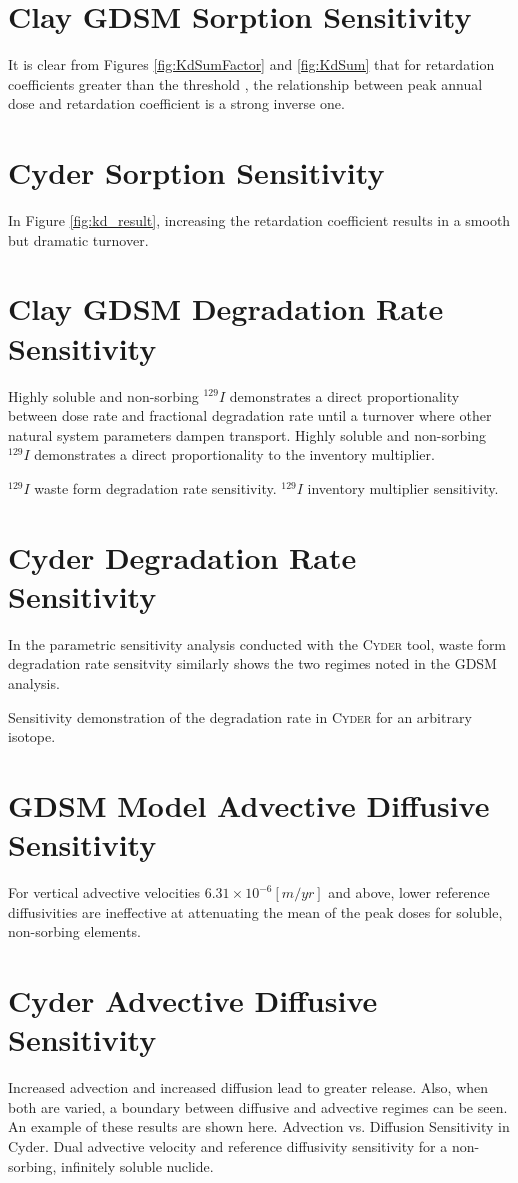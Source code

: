 \documentclass[letterpaper]{article}
\newcommand{\Cyder}{\textsc{Cyder}\xspace}
\begin{document}
\section*{Clay GDSM Sorption Sensitivity}
It is clear from Figures \ref{fig:KdSumFactor} and \ref{fig:KdSum} that 
for retardation coefficients greater than the threshold , the 
relationship between peak annual dose and retardation coefficient is a strong 
inverse one. 
\section*{Cyder Sorption Sensitivity}

In Figure \ref{fig:kd_result}, increasing the retardation 
coefficient results in a smooth but dramatic turnover. 


\section*{Clay GDSM Degradation Rate Sensitivity}

Highly soluble and non-sorbing $^{129}I$ demonstrates a direct proportionality between dose rate and 
fractional degradation rate until a turnover where other natural system 
parameters dampen transport. Highly soluble and non-sorbing $^{129}I$ demonstrates a direct 
proportionality to the inventory multiplier.

$^{129}I$ waste form degradation rate sensitivity.
$^{129}I$ inventory multiplier sensitivity.


\section*{Cyder Degradation Rate Sensitivity}
In the parametric sensitivity analysis conducted with the \Cyder tool, waste 
form degradation rate sensitvity similarly shows the two regimes noted in the 
GDSM analysis.  

Sensitivity demonstration of the degradation rate in \Cyder for an 
arbitrary isotope.


\section*{GDSM Model Advective Diffusive Sensitivity}
For vertical advective velocities 
$6.31\times10^{-6}[m/yr]$ and above, lower reference diffusivities are 
ineffective at attenuating the mean of the peak doses for soluble, non-sorbing 
elements. 

\section*{Cyder Advective Diffusive Sensitivity}
Increased advection and increased diffusion lead to greater release. Also, when 
both are varied, a boundary between diffusive and advective
regimes can be seen. An example of these results are shown here.
Advection vs. Diffusion Sensitivity in Cyder. Dual advective velocity 
and reference diffusivity sensitivity for a non-sorbing, infinitely soluble 
nuclide.
\end{document}
